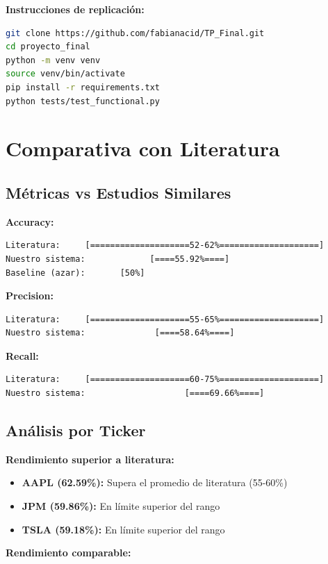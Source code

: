 \documentclass[12pt,a4paper]{article}
\begin{document}
\textbf{Instrucciones de replicación:}
\begin{lstlisting}[language=bash]
git clone https://github.com/fabianacid/TP_Final.git
cd proyecto_final
python -m venv venv
source venv/bin/activate
pip install -r requirements.txt
python tests/test_functional.py
\end{lstlisting}

\section{Comparativa con Literatura}

\subsection{Métricas vs Estudios Similares}

\textbf{Accuracy:}
\begin{verbatim}
Literatura:     [====================52-62%====================]
Nuestro sistema:             [====55.92%====]
Baseline (azar):       [50%]
\end{verbatim}

\textbf{Precision:}
\begin{verbatim}
Literatura:     [====================55-65%====================]
Nuestro sistema:              [====58.64%====]
\end{verbatim}

\textbf{Recall:}
\begin{verbatim}
Literatura:     [====================60-75%====================]
Nuestro sistema:                    [====69.66%====]
\end{verbatim}

\subsection{Análisis por Ticker}

\textbf{Rendimiento superior a literatura:}

\begin{itemize}
    \item \textbf{AAPL (62.59\%):} Supera el promedio de literatura (55-60\%)
    \item \textbf{JPM (59.86\%):} En límite superior del rango
    \item \textbf{TSLA (59.18\%):} En límite superior del rango
\end{itemize}

\textbf{Rendimiento comparable:}
\end{document}
